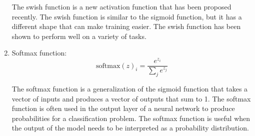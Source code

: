 \begin{enumerate}
    The swish function is a new activation function that has been proposed recently.
    The swish function is similar to the sigmoid function, but it has a different
    shape that can make training easier. The swish function has been shown to perform
    well on a variety of tasks.

    \item Softmax function:
    \begin{equation}
        \text{softmax}(z)_i = \frac{e^{z_i}}{\sum_{j} e^{z_j}}
    \end{equation}

    The softmax function is a generalization of the sigmoid function that takes a
    vector of inputs and produces a vector of outputs that sum to 1. The softmax
    function is often used in the output layer of a neural network to produce
    probabilities for a classification problem. The softmax function is useful
    when the output of the model needs to be interpreted as a probability distribution.

\end{enumerate}

